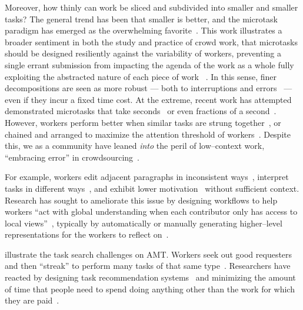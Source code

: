 \documentclass[trackingWork]{subfiles}
\begin{document}
Moreover,
how thinly can work be sliced and subdivided into smaller and smaller tasks? 
The general trend has been that smaller is better,
and the microtask paradigm has emerged as the overwhelming favorite~\cite{selfsourcingTeevan2014,selfsourcingTeevan2016}.
This work illustrates a broader sentiment in both the study and practice
of crowd work,
that microtasks should be designed resiliently against the variability of workers,
preventing a single errant submission from impacting the agenda of the work as a whole %
fully exploiting the abstracted nature of each piece of work
~\cite{interruptionIqbal,delayAndOrderLasecki,vaish2014low}.
In this sense,
finer decompositions are seen as more robust
--- both to interruptions and errors~\cite{cheng2015break} ---
even if they incur a fixed time cost.
At the extreme,
recent work has attempted demonstrated
microtasks that take seconds~\cite{Vaish:2014:TCC:2611222.2556996,Cai:2015:WLW:2702123.2702267}
or even fractions of a second~\cite{embracingErrorKrishna}.
However,
workers perform better when similar tasks are strung together~\cite{delayAndOrderLasecki},
or
chained and arranged to maximize the attention threshold of workers~\cite{Cai:2016:CRI:2858036.2858237}.
Despite this,
we as a community have leaned \textit{into} the peril of
low--context work, ``embracing error'' in crowdsourcing~\cite{embracingErrorKrishna}.


For example,
workers edit adjacent paragraphs in inconsistent ways~\cite{bernsteinSoylent,Kim2017},
interpret tasks in different ways~\cite{kairam2016parting},
and exhibit lower motivation~\cite{Kinnaird:2012:WTM:2389176.2389219} without sufficient context.
Research has sought to ameliorate this issue by
designing workflows to help workers ``act with global understanding when
each contributor only has access to local views''~\cite{verroios2014context},
typically by automatically or manually generating higher--level representations
for the workers to reflect on~\cite{chilton2013cascade,verroios2014context,Kim2017}.

\citeauthor{taskSearch} illustrate the task search challenges on AMT.
Workers seek out good requesters~\cite{martin2014being} and then 
``streak'' to perform many tasks of that same type~\cite{taskSearch}.
Researchers have reacted by designing task recommendation systems~\cite[e.g.][]{Cosley:2007:SUI:1216295.1216309}
and minimizing the amount of time that people need to spend doing anything other than
the work for which they are paid~\cite{callison2014crowd}.
\end{document}
